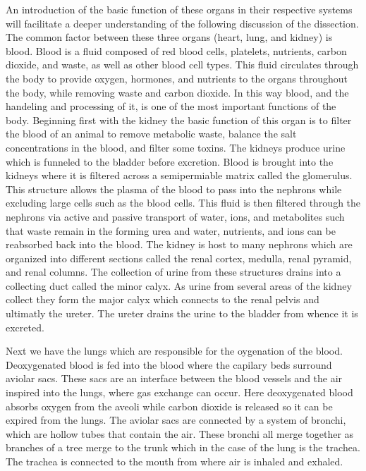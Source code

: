\documentclass[12pt]{article}
\begin{document}
\par{}
An introduction of the basic function of these organs in their respective systems will facilitate a deeper understanding of the following discussion of the dissection. The common factor between these three organs (heart, lung, and kidney) is blood. Blood is a fluid composed of red blood cells, platelets, nutrients, carbon dioxide, and waste, as well as other blood cell types. This fluid circulates through the body to provide oxygen, hormones, and nutrients to the organs throughout the body, while removing waste and carbon dioxide. In this way blood, and the handeling and processing of it, is one of the most important functions of the body. Beginning first with the kidney the basic function of this organ is to filter the blood of an animal to remove metabolic waste, balance the salt concentrations in the blood, and filter some toxins. The kidneys produce urine which is funneled to the bladder before excretion. Blood is brought into the kidneys where it is filtered across a semipermiable matrix called the glomerulus. This structure allows the plasma of the blood to pass into the nephrons while excluding large cells such as the blood cells. This fluid is then filtered through the nephrons via active and passive transport of water, ions, and metabolites such that waste remain in the forming urea and water, nutrients, and ions can be reabsorbed back into the blood. The kidney is host to many nephrons which are organized into different sections called the renal cortex, medulla, renal pyramid, and renal columns. The collection of urine from these structures drains into a collecting duct called the minor calyx. As urine from several areas of the kidney collect they form the major calyx which connects to the renal pelvis and ultimatly the ureter. The ureter drains the urine to the bladder from whence it is excreted.
\par{}
Next we have the lungs which are responsible for the oygenation of the blood. Deoxygenated blood is fed into the blood where the capilary beds surround aviolar sacs. These sacs are an interface between the blood vessels and the air inspired into the lungs, where gas exchange can occur. Here deoxygenated blood absorbs oxygen from the aveoli while carbon dioxide is released so it can be expired from the lungs. The aviolar sacs are connected by a system of bronchi, which are hollow tubes that contain the air. These bronchi all merge together as branches of a tree merge to the trunk which in the case of the lung is the trachea. The trachea is connected to the mouth from where air is inhaled and exhaled.
\end{document}
